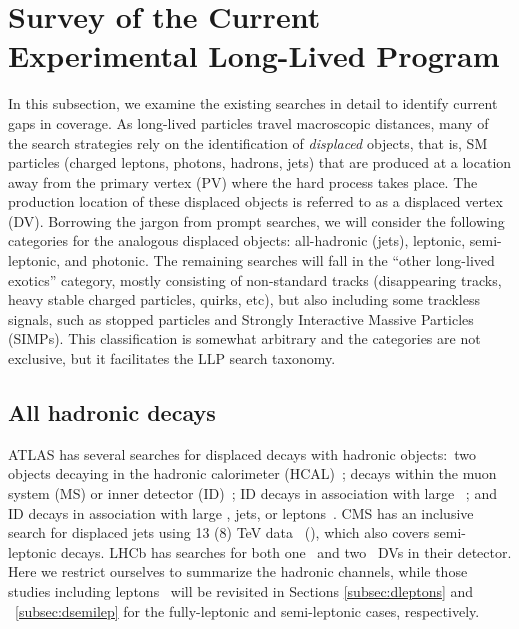 \section{Survey of the Current Experimental Long-Lived Program}
\label{sec:survey}
In this subsection, we examine the existing searches in detail to identify current gaps in coverage.  As long-lived particles travel macroscopic distances, many of the search strategies rely on the identification of \emph{displaced} objects, that is, SM particles (charged leptons, photons, hadrons, jets) that are produced at a location away from the primary vertex (PV) where the hard process takes place.
The production location of these displaced objects is referred to as a displaced vertex (DV). Borrowing the jargon from prompt searches, we will consider the following categories for the analogous displaced objects: all-hadronic (jets), leptonic, semi-leptonic, and photonic. The remaining searches will fall in the ``other long-lived exotics'' category, mostly consisting of non-standard tracks (disappearing tracks,  heavy stable charged particles, quirks, etc), but also including some trackless signals, such as stopped particles and Strongly Interactive Massive Particles (SIMPs). 
This classification is somewhat arbitrary and the categories are not exclusive, but it facilitates the LLP search taxonomy.

\subsection{All hadronic decays}
\label{subsec:djets}

ATLAS has several searches for displaced decays with hadronic objects:~two objects decaying in the hadronic calorimeter (HCAL)~\cite{ATLAS-CONF-2016-103,CalRatio8TeV}; decays within the muon system (MS) or inner detector (ID)~\cite{Aad:2015uaa}; ID decays in association with large \met ~\cite{Aaboud:2017iio}; and ID decays in association with large 
\met, jets, or leptons~\cite{Aad:2015rba}.  CMS has an inclusive search for displaced jets using 13 (8) TeV data~\cite{CMS:2017oor} (\cite{Khachatryan:2015wka}), which also covers semi-leptonic decays. LHCb has searches for both one~\cite{Aaij:2017mic} and two~\cite{Aaij:2016isa} DVs in their detector. Here we restrict ourselves to summarize the hadronic channels, while those studies including leptons~\cite{Aad:2015rba,CMS:2017oor} will be revisited in Sections \ref{subsec:dleptons} and ~\ref{subsec:dsemilep} for the fully-leptonic and semi-leptonic cases, respectively.

